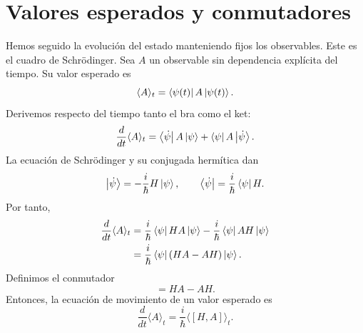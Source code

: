 \begin{classroomqa}
\end{classroomqa}

\section{Valores esperados y conmutadores}

Hemos seguido la evolución del estado manteniendo fijos los observables. Este es el cuadro de Schr\"odinger. Sea \(A\) un observable sin dependencia explícita del tiempo. Su valor esperado es
\begin{equation}
\langle A\rangle_t
=
\left\langle\psi(t)\right\rvert A\left\lvert\psi(t)\right\rangle.
\end{equation}
Derivemos respecto del tiempo tanto el bra como el ket:
\begin{equation}
\frac{d}{dt}\langle A\rangle_t
=
\left\langle\dot\psi\right\rvert A\left\lvert\psi\right\rangle
+
\left\langle\psi\right\rvert A\left\lvert\dot\psi\right\rangle.
\end{equation}
La ecuación de Schr\"odinger y su conjugada hermítica dan
\begin{equation}
\left\lvert\dot\psi\right\rangle
=-\frac{i}{\hbar}H\left\lvert\psi\right\rangle,
\qquad
\left\langle\dot\psi\right\rvert
=\frac{i}{\hbar}\left\langle\psi\right\rvert H.
\end{equation}
Por tanto,
\begin{align}
\frac{d}{dt}\langle A\rangle_t
&=
\frac{i}{\hbar}\left\langle\psi\right\rvert HA\left\lvert\psi\right\rangle
-\frac{i}{\hbar}\left\langle\psi\right\rvert AH\left\lvert\psi\right\rangle \\
&=
\frac{i}{\hbar}\left\langle\psi\right\rvert(HA-AH)\left\lvert\psi\right\rangle.
\end{align}
Definimos el conmutador
\begin{equation}
[H,A]=HA-AH.
\end{equation}
Entonces, la ecuación de movimiento de un valor esperado es
\begin{equation}
\boxed{
\frac{d}{dt}\langle A\rangle_t
=
\frac{i}{\hbar}\langle[H,A]\rangle_t
}.
\end{equation}

